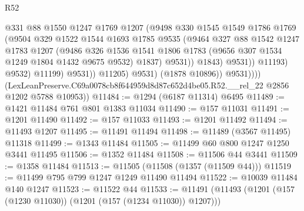 \begin{lexlean}{R52}
\begin{coremodule}
                                  @331
                                  @88
                                  @1550
                                  @1247
                                  @1769
                                  @1207
                                  (@9498
                                    @330
                                    @1545
                                    @1549
                                    @1786
                                    @1769
                                    (@9504
                                      @329
                                      @1522
                                      @1544
                                      @1693
                                      @1785
                                      @9535
                                      (@9464
                                        @327
                                        @88
                                        @1542
                                        @1247
                                        @1783
                                        @1207
                                        (@9486
                                          @326
                                          @1536
                                          @1541
                                          @1806
                                          @1783
                                          (@9656 @307 @1534 @1249 @1804 @1432 @9675 @9532)
                                          @1837)
                                        @9531))
                                    @1843)
                                  @9531))
                              @11193)
                            @9532)
                          @11199)
                        @9531))
                    @11205)
                  @9531)
                (@1878 @10896))
              @9531))))
      (LexLeanPreserve.C69a0078cb8f644959d8d87c652d4be05.R52.__rel_22 @2856 @1202 @5788 @10953))
@11484 := @1294 (@6187 @11314) @6495
@11489 := @1421 @11484 @761 @801 @1383 @11034
@11490 := @157 @11031
@11491 := @1201 @11490
@11492 := @157 @11033
@11493 := @1201 @11492
@11494 := @11493 @1207
@11495 := @11491 @11494
@11498 := @11489 (@3567 @11495) @11318
@11499 := @1343 @11484
@11505 := @11499 @60 @800 @1247 @1250 @3441 @11495
@11506 := @1352 @11484
@11508 := @11506 @44 @3441
@11509 := @1358 @11484
@11513 := @11505 (@11508 (@1357 (@11509 @44)))
@11519 := @11499 @795 @799 @1247 @1249 @11490 @11494
@11522 := @10039 @11484 @140 @1247
@11523 := @11522 @44
@11533 := @11491 (@11493 (@1201 (@157 (@1230 @11030)) (@1201 (@157 (@1234 @11030)) @1207)))

\end{coremodule}
\end{lexlean}
